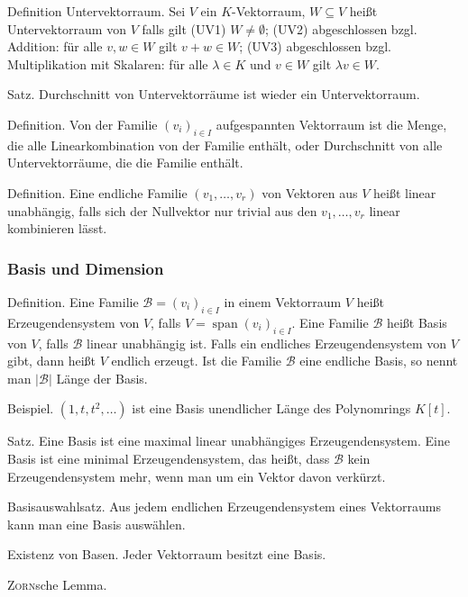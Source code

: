 \documentclass[fleqn,draft,a5paper]{article}
\DeclareMathOperator{\Span}{span}
\providecommand{\abs}[1]{\left\lvert#1\right\rvert}
\begin{document}
Definition Untervektorraum.  Sei \(V\) ein \(K\)-Vektorraum, \(W \subseteq V\) heißt
Untervektorraum von \(V\) falls gilt (UV1) \(W \ne \emptyset\); (UV2) abgeschlossen
bzgl. Addition: für alle \(v, w
\in W\) gilt \(v+w \in W\); (UV3) abgeschlossen bzgl. Multiplikation mit
Skalaren: für alle \(\lambda \in K\) und \(v \in W\) gilt \(\lambda v \in W\).

Satz.  Durchschnitt von Untervektorräume ist wieder ein
Untervektorraum.

Definition.  Von der Familie \((v_{i})_{i \in I}\) aufgespannten
Vektorraum ist  die Menge, die alle Linearkombination von der Familie
enthält, oder Durchschnitt von alle Untervektorräume, die die Familie
enthält.

Definition.  Eine endliche Familie \((v_{1}, \ldots, v_{r})\) von Vektoren
aus \(V\) heißt linear unabhängig, falls sich der Nullvektor nur trivial
aus den \(v_{1}, \ldots, v_{r}\) linear kombinieren lässt.

\subsubsection{Basis und Dimension}

Definition.  Eine Familie \(\mathcal{B} = (v_{i})_{i \in I}\) in einem Vektorraum
\(V\) heißt Erzeugendensystem von \(V\), falls
\(V = \Span (v_{i})_{i\in I}\).  Eine Familie \(\mathcal{B}\) heißt Basis von
\(V\), falls \(\mathcal{B}\) linear unabhängig ist.  Falls ein endliches
Erzeugendensystem von \(V\) gibt, dann heißt \(V\) endlich erzeugt.  Ist
die Familie \(\mathcal{B}\) eine endliche Basis, so nennt man
\(\abs{\mathcal{B}}\) Länge der Basis.

Beispiel.  \((1, t, t^{2}, \ldots)\) ist eine Basis unendlicher Länge des
Polynomrings \(K[t]\).
 
Satz.  Eine Basis ist eine maximal linear unabhängiges
Erzeugendensystem.  Eine Basis ist eine minimal Erzeugendensystem, das
heißt, dass \(\mathcal{B}\) kein Erzeugendensystem mehr, wenn man um ein Vektor
davon verkürzt.

Basisauswahlsatz.  Aus jedem endlichen Erzeugendensystem eines
Vektorraums kann man eine Basis auswählen.

Existenz von Basen.  Jeder Vektorraum besitzt eine Basis.

\textsc{Zorn}sche Lemma.
\end{document}
